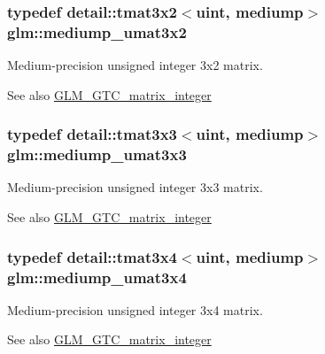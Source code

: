 \subsubsection[{\texorpdfstring{mediump\+\_\+umat3x2}{mediump_umat3x2}}]{\setlength{\rightskip}{0pt plus 5cm}typedef detail\+::tmat3x2$<$uint, mediump$>$ {\bf glm\+::mediump\+\_\+umat3x2}}\hypertarget{group__gtc__matrix__integer_ga65a9fdb1a5918fe6f308577065983e23}{}\label{group__gtc__matrix__integer_ga65a9fdb1a5918fe6f308577065983e23}
Medium-\/precision unsigned integer 3x2 matrix. \begin{DoxySeeAlso}{See also}
\hyperlink{group__gtc__matrix__integer}{G\+L\+M\+\_\+\+G\+T\+C\+\_\+matrix\+\_\+integer} 
\end{DoxySeeAlso}
\subsubsection[{\texorpdfstring{mediump\+\_\+umat3x3}{mediump_umat3x3}}]{\setlength{\rightskip}{0pt plus 5cm}typedef detail\+::tmat3x3$<$uint, mediump$>$ {\bf glm\+::mediump\+\_\+umat3x3}}\hypertarget{group__gtc__matrix__integer_ga31a05e7b2a6a596bdc7ceeb5d9c10e1c}{}\label{group__gtc__matrix__integer_ga31a05e7b2a6a596bdc7ceeb5d9c10e1c}
Medium-\/precision unsigned integer 3x3 matrix. \begin{DoxySeeAlso}{See also}
\hyperlink{group__gtc__matrix__integer}{G\+L\+M\+\_\+\+G\+T\+C\+\_\+matrix\+\_\+integer} 
\end{DoxySeeAlso}
\subsubsection[{\texorpdfstring{mediump\+\_\+umat3x4}{mediump_umat3x4}}]{\setlength{\rightskip}{0pt plus 5cm}typedef detail\+::tmat3x4$<$uint, mediump$>$ {\bf glm\+::mediump\+\_\+umat3x4}}\hypertarget{group__gtc__matrix__integer_ga8113e067e1f327fac64cf9015c8c5431}{}\label{group__gtc__matrix__integer_ga8113e067e1f327fac64cf9015c8c5431}
Medium-\/precision unsigned integer 3x4 matrix. \begin{DoxySeeAlso}{See also}
\hyperlink{group__gtc__matrix__integer}{G\+L\+M\+\_\+\+G\+T\+C\+\_\+matrix\+\_\+integer} 
\end{DoxySeeAlso}
